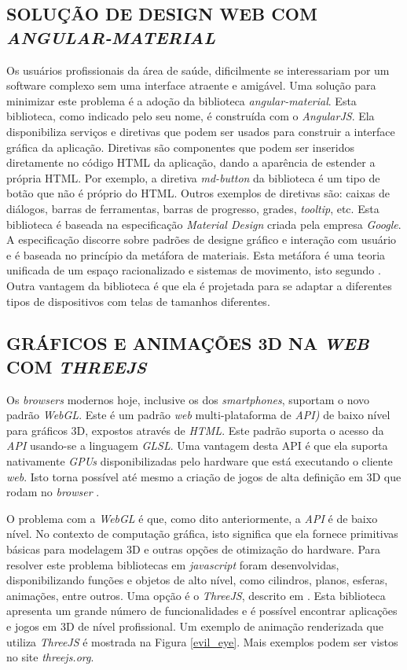 \subsection{SOLUÇÃO DE DESIGN WEB COM \emph{ANGULAR-MATERIAL}}
\label{angular_material}

Os usuários profissionais da área de saúde, dificilmente se interessariam por um software complexo sem uma interface atraente e amigável.
Uma solução para minimizar este problema é a adoção da  biblioteca \emph{angular-material}. 
Esta biblioteca, como indicado pelo seu nome, é construída com o \emph{AngularJS}. 
Ela disponibiliza serviços e diretivas que podem ser usados para construir a interface gráfica da aplicação. 
Diretivas são componentes que podem ser inseridos diretamente no código HTML da aplicação, dando a aparência de estender a própria HTML. 
Por exemplo, a diretiva \emph{md-button} da biblioteca é um tipo de botão que não é próprio do HTML. 
Outros exemplos de diretivas são: caixas de diálogos, barras de ferramentas, barras de progresso, grades, \emph{tooltip}, etc. 
Esta biblioteca é baseada na especificação \emph{Material Design} criada pela empresa \emph{Google}. 
A especificação discorre sobre padrões de designe gráfico e interação com usuário e é baseada no princípio da metáfora de materiais. 
Esta metáfora é uma teoria unificada de um espaço racionalizado e sistemas de movimento, isto segundo \cite{Google2015a}. Outra vantagem da biblioteca é que ela é projetada para se adaptar a diferentes tipos de dispositivos com telas de tamanhos diferentes.


\subsection{GRÁFICOS E ANIMAÇÕES 3D NA \emph{WEB} COM \emph{THREEJS}} 
Os \emph{browsers} modernos hoje, inclusive os dos \emph{smartphones}, suportam o novo padrão \emph{WebGL}. 
Este é um padrão \emph{web} multi-plataforma de \emph{API)} de baixo nível para gráficos 3D, expostos através de \emph{HTML}. 
Este padrão suporta o acesso da \emph{API} usando-se a linguagem \emph{GLSL}. 
Uma vantagem desta API é que ela suporta nativamente \emph{GPUs} disponibilizadas pelo hardware que está executando o cliente \emph{web}. 
Isto torna possível até mesmo a criação de jogos de alta definição em 3D que rodam no \emph{browser} \cite{Matsuda2013}.

O problema com a \emph{WebGL} é que, como dito anteriormente, a \emph{API} é de baixo nível. 
No contexto de computação gráfica, isto significa que ela fornece primitivas básicas para modelagem 3D e outras opções de otimização do hardware.
Para resolver este problema bibliotecas em \emph{javascript} foram desenvolvidas, disponibilizando funções e objetos de alto nível, como cilindros, planos, esferas, animações, entre outros. 
Uma opção é o \emph{ThreeJS}, descrito em \cite{Dirksen2015}. 
Esta biblioteca apresenta um grande número de funcionalidades e é possível encontrar aplicações e jogos em 3D de nível profissional. 
Um exemplo de animação renderizada que utiliza \emph{ThreeJS} é mostrada na Figura \ref{evil_eye}.
Mais exemplos podem ser vistos no site \emph{threejs.org}.

